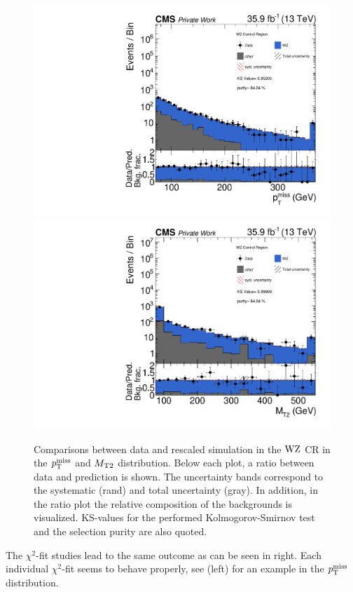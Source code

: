 \begin{figure}[tbp]
 \centering
 \includegraphics[width=\pairwidth]{figures/plots_CR_wz/CRWZ_LL_nom_met_log}
 \includegraphics[width=\pairwidth]{figures/plots_CR_wz/CRWZ_LL_nom_mt2_log}
 \caption{Comparisons between data and rescaled simulation in the $\mathrm{W}\mathrm{Z}$ CR in the $p_{\mathrm{T}}^\text{miss}$ and $M_{\mathrm{T2}}$ distribution. Below each plot, a ratio between data and prediction is shown. The uncertainty bands correspond to the systematic (rand) and total uncertainty (gray). In addition, in the ratio plot the relative composition of the backgrounds is visualized. KS-values for the performed Kolmogorov-Smirnov test and the selection purity are also quoted.}
 \label{fig:CRWZ}
\end{figure}
The $\chi^2$-fit studies lead to the same outcome as can be seen in  right. Each individual $\chi^2$-fit seems to behave properly, see  (left) for an example in the $p_{\mathrm{T}}^\text{miss}$ distribution.

